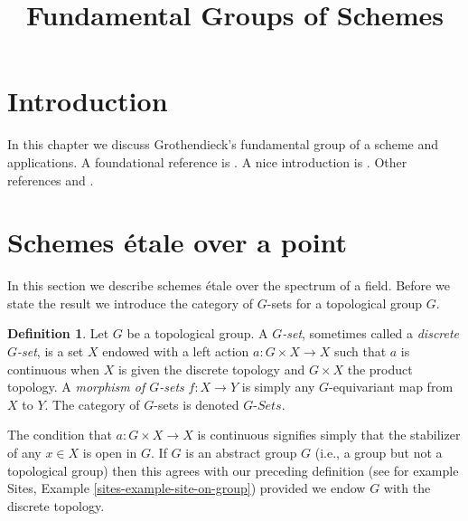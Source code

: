 \documentclass{stacks-project}
\theoremstyle{plain}
\theoremstyle{definition}
\newtheorem{definition}[subsection]{Definition}
\theoremstyle{remark}
\numberwithin{equation}{subsection}
\begin{document}
\title{Fundamental Groups of Schemes}


\maketitle

\label{section-phantom}

\tableofcontents

\section{Introduction}
\label{section-introduction}

\noindent
In this chapter we discuss Grothendieck's fundamental group of a scheme
and applications. A foundational reference is \cite{SGA1}.
A nice introduction is \cite{Lenstra}.
Other references \cite{Murre-lectures} and \cite{Grothendieck-Murre}.










\section{Schemes \'etale over a point}
\label{section-schemes-etale-point}

\noindent
In this section we describe schemes \'etale over the spectrum of a field.
Before we state the result we introduce the category of $G$-sets for a
topological group $G$.

\begin{definition}
\label{definition-G-set-continuous}
Let $G$ be a topological group.
A {\it $G$-set}, sometimes called a {\it discrete $G$-set},
is a set $X$ endowed with a left action $a : G \times X \to X$
such that $a$ is continuous when $X$ is given the discrete topology and
$G \times X$ the product topology.
A {\it morphism of $G$-sets} $f : X \to Y$ is simply any $G$-equivariant
map from $X$ to $Y$.
The category of $G$-sets is denoted {\it $G\textit{-Sets}$}.
\end{definition}

\noindent
The condition that $a : G \times X \to X$ is continuous signifies
simply that the stabilizer of any  $x \in X$ is open in $G$.
If $G$ is an abstract group $G$ (i.e., a group but not a topological group)
then this agrees with our preceding definition (see for example
Sites, Example \ref{sites-example-site-on-group})
provided we endow $G$ with the discrete topology.
\end{document}
